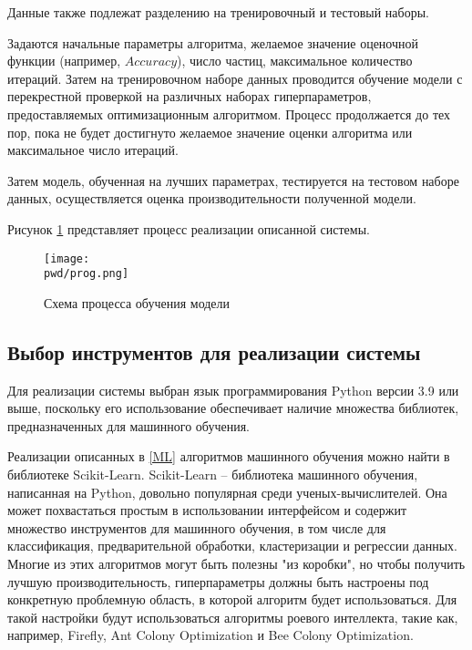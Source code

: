 Данные также подлежат разделению на тренировочный и тестовый наборы. 

Задаются начальные параметры алгоритма, желаемое значение оценочной функции (например, $Accuracy$), 
число частиц, максимальное количество итераций. Затем на тренировочном наборе данных 
проводится обучение модели с перекрестной проверкой на различных наборах 
гиперпараметров, предоставляемых оптимизационным алгоритмом. Процесс продолжается 
до тех пор, пока не будет достигнуто желаемое значение оценки алгоритма или 
максимальное число итераций.

Затем модель, обученная на лучших параметрах, тестируется на тестовом наборе данных, 
осуществляется оценка производительности полученной модели.

Рисунок \ref{scheme} представляет процесс реализации описанной системы.

\begin{figure}[H]	
    \centering
    \texttt{[image: \\pwd/prog.png]}
    \caption{Схема процесса обучения модели}
    \label{scheme}
\end{figure}

\subsection{Выбор инструментов для реализации системы}

Для реализации системы выбран язык программирования Python версии 3.9 или выше, 
поскольку его использование обеспечивает наличие множества библиотек, 
предназначенных для машинного обучения. 

Реализации описанных в \ref{ML} алгоритмов машинного обучения 
можно найти в библиотеке Scikit-Learn. Scikit-Learn -- 
библиотека машинного обучения, написанная на Python, довольно популярная
среди ученых-вычислителей. Она может похвастаться простым в использовании 
интерфейсом и содержит множество инструментов для машинного обучения, в том числе 
для классификация, предварительной обработки, кластеризации и регрессии данных. 
Многие из этих алгоритмов могут быть полезны "из коробки", но чтобы получить
лучшую производительность, гиперпараметры должны быть настроены под конкретную 
проблемную область, в которой алгоритм будет использоваться. Для такой настройки 
будут использоваться алгоритмы роевого интеллекта, такие как, например, Firefly, Ant 
Colony Optimization и Bee Colony Optimization.